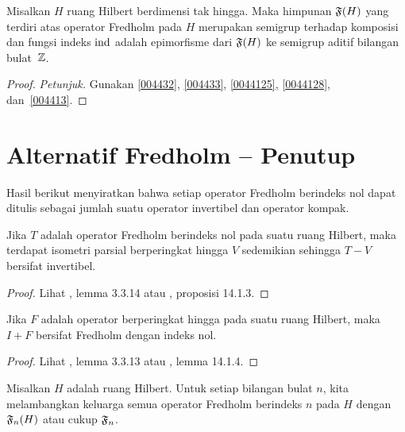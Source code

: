 \begin{prop} Misalkan $H$ ruang Hilbert berdimensi tak hingga. Maka himpunan $\mathfrak{F}(H)$ yang terdiri atas operator Fredholm
pada $H$ merupakan semigrup terhadap komposisi dan fungsi indeks $\operatorname{ind}$ adalah epimorfisme
dari $\mathfrak{F}(H)$ ke semigrup aditif bilangan bulat~$\mathbb{Z}$.
\end{prop}

\begin{proof} \emph{Petunjuk.} Gunakan \ref{004432}, \ref{004433}, \ref{0044125}, \ref{0044128},
dan~\ref{004413}. \ns
\end{proof}





















\section{Alternatif Fredholm -- Penutup}
Hasil berikut menyiratkan bahwa setiap operator Fredholm berindeks nol dapat ditulis sebagai
jumlah suatu operator invertibel dan operator kompak.

\begin{prop}\label{004712} Jika $T$ adalah operator Fredholm berindeks nol pada suatu ruang Hilbert,
maka terdapat isometri parsial berperingkat hingga $V$ sedemikian sehingga $T - V$ bersifat invertibel.
\end{prop}

\begin{proof} Lihat \cite{Pedersen:1995}, lemma 3.3.14 atau \cite{Wegge-Olsen:1993}, proposisi
14.1.3.  \ns
\end{proof}

\begin{lem} Jika $F$ adalah operator berperingkat hingga pada suatu ruang Hilbert, maka $I + F$ bersifat Fredholm dengan
indeks nol.
\end{lem}

\begin{proof} Lihat \cite{Pedersen:1995}, lemma 3.3.13 atau \cite{Wegge-Olsen:1993}, lemma 14.1.4. \ns
\end{proof}

\begin{notn} Misalkan $H$ adalah ruang Hilbert. Untuk setiap bilangan bulat $n$, kita melambangkan
keluarga semua operator Fredholm berindeks $n$ pada $H$ dengan $\mathfrak{F}_n(H)$ atau cukup $\mathfrak{F}_n$.
\end{notn}

